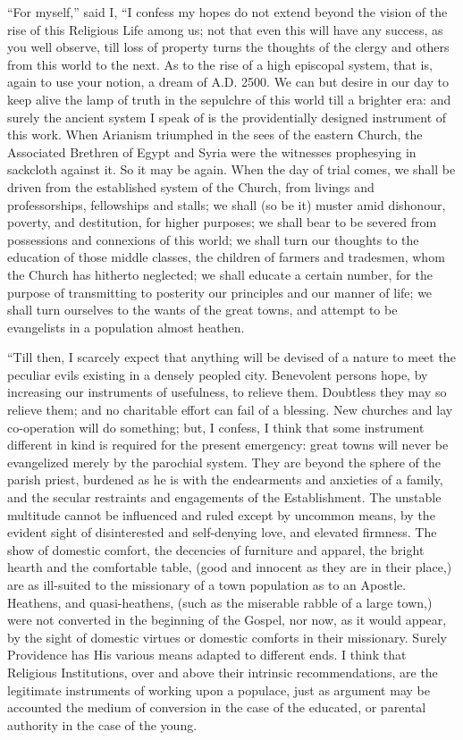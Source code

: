 ``For myself,'' said I, ``I confess my hopes do not
extend beyond the vision of the rise of this Religious Life among us;
not that even this will have any success, as you well observe, till
loss of property turns the thoughts of the clergy and others from this
world to the next. As to the rise of a high episcopal system, that is,
again to use your notion, a dream of A.D.
2500. We can but desire in our day to keep alive the lamp of truth in
the sepulchre of this world till a brighter era: and surely the
ancient system I speak of is the providentially designed instrument of
this work. When Arianism triumphed in the sees of the eastern Church,
the Associated Brethren of Egypt and Syria were the witnesses
prophesying in sackcloth against it. So it may be again. When the day
of trial comes, we shall be driven from the established system of the
Church, from livings and professorships, fellowships and stalls; we
shall (so be it) muster amid dishonour, poverty, and destitution, for
higher purposes; we shall bear to be severed from possessions and
connexions of this world; we shall turn our thoughts to the education
of those middle classes, the children of farmers and tradesmen, whom
the Church has hitherto neglected; we shall educate a certain number,
for the purpose of transmitting to posterity our principles and our
manner of life; we shall turn ourselves to the wants of the great
towns, and attempt to be evangelists in a population almost heathen.

``Till then, I scarcely expect that anything will
be devised of a nature to meet the peculiar evils existing in a
densely peopled city. Benevolent persons hope, by increasing our
instruments of usefulness, to relieve them. Doubtless they may so
relieve them; and no charitable effort can fail of a blessing. New
churches and lay co-operation will do something; but, I confess, I
think that some instrument different in kind is required for the
present emergency: great towns will never be evangelized merely by the
parochial system. They are beyond the sphere of the parish priest,
burdened as he is with the endearments and anxieties of a family, and
the secular restraints and engagements of the Establishment. The
unstable multitude cannot be influenced and ruled except by uncommon
means, by the evident sight of disinterested and self-denying love,
and elevated firmness. The show of domestic comfort, the decencies of
furniture and apparel, the bright hearth and the comfortable table,
(good and innocent as they are in their place,) are as ill-suited to
the missionary of a town population as to an Apostle. Heathens, and
quasi-heathens, (such as the miserable rabble of a large town,) were
not converted in the beginning of the Gospel, nor now, as it would
appear, by the sight of domestic virtues or domestic comforts in their
missionary. Surely Providence has His various means adapted to
different ends. I think that Religious Institutions, over and above
their intrinsic recommendations, are the legitimate instruments of
working upon a populace, just as argument may be accounted the medium
of conversion in the case of the educated, or parental authority in
the case of the young.

